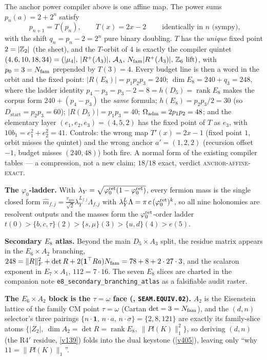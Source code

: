 \begin{keybox}
The anchor power compiler above is one affine map.  The power sums $p_n(a)=2+2^n$ satisfy
\[
  \boxed{\ p_{n+1}=T(p_n),\qquad T(x)=2x-2\ }\qquad\text{identically in $n$ (sympy),}
\]
with the shift $q_n=p_n-2=2^n$ pure binary doubling.  $T$ has the \emph{unique} fixed point
$2=|\mathbb{Z}_2|$ (the sheet), and the $T$-orbit of $4$ is exactly the compiler quintet
$(4,6,10,18,34)=(|\mu_4|,\,|R^+(A_3)|,\,\mathcal A_\Lambda,\,N_{\mathrm{fam}}|R^+(A_3)|,\,\text{$\mathbb{Z}_6$ lift})$, with
$p_0=3=N_{\mathrm{fam}}$ prepended by $T(3)=4$.  Every budget line is then a word in the orbit and the fixed
point: $|R(E_8)|=p_1p_2p_3=240$; $\dim E_8=240+q_3=248$, where the ladder identity
$p_4-p_3=p_3-2=8=h(D_5)=\operatorname{rank}E_8$ makes the corpus form $240+(p_4{-}p_3)$ the
\emph{same} formula; $h(E_8)=p_2p_3/2=30$ (so $D_{\mathrm{start}}=p_2p_3=60$); $|R(D_5)|=p_1p_3=40$;
$\Omega_{\mathrm{adm}}=2p_1p_2=48$; and the elementary layer $(e_1,e_2,e_3)=(4,5,2)$ has the fixed point of $T$ as
$e_3$, with $10b_1=e_1^2+e_2^2=41$.  Controls: the wrong map $T'(x)=2x-1$ (fixed point $1$, orbit
misses the quintet) and the wrong anchor $a'=(1,2,2)$ (recursion offset $-1$, budget misses
$(240,48)$) both fire.  A normal form of the existing compiler tables --- a compression, not a new
claim; $18/18$ exact, verdict \textsc{anchor-affine-exact}.
\end{keybox}

\noindent\textbf{The $\varphi_0$-ladder.} With $\lambda_Y=\sqrt{\varphi_0^{\mathrm{ret}}(1-\varphi_0^{\mathrm{ret}})}$, every fermion mass is the
single closed form $\hat m_{f,j}=\tfrac{v_{\mathrm{geo}}}{\sqrt2}\lambda_Y^{L_{f,j}}\Lambda_{f,j}$ with
$\lambda_Y^{L}\Lambda=\pi\,c\,(\varphi_0^{\mathrm{ret}})^{k}$, so all nine holonomies are resolvent outputs and the masses
form the $\varphi_0^{\mathrm{ret}}$-order ladder $t(0)>\{b,c,\tau\}(2)>\{s,\mu\}(3)>\{u,d\}(4)>e(5)$.

\noindent\textbf{Secondary $E_8$ atlas.} Beyond the main $D_5\times A_3$ split, the residue matrix appears
in the $E_6\times A_2$ branching, $248=\|R\|_F^2+\det R+2(\mathbf 1^\top Ra)N_{\mathrm{fam}}=78+8+2\cdot27\cdot3$, and
the scalaron exponent in $E_7\times A_1$, $112=7\cdot16$. The seven $E_8$ slices are charted in the
companion note \texttt{e8\_secondary\_branching\_atlas} as a falsifiable audit raster.
\par\smallskip\noindent\textbf{The $E_6{\times}A_2$ block is the $\tau{=}\omega$ face
(, \texttt{SEAM.EQUIV.02}).} $A_2$ is the Eisenstein lattice of the family
CM point $\tau{=}\omega$ (Cartan $\det=3=N_{\mathrm{fam}}$), and the $(d,n)$ selector's three pairings
$\{n{\cdot}\mathbf1,\,n{\cdot}a,\,n{\cdot}\sigma\}=\{2,8,121\}$ are exactly its family-slice atoms
$\{|Z_2|,\ \dim A_2{=}\det R{=}\operatorname{rank}E_8,\ \|Pl(K)\|_1^2\}$, so deriving $(d,n)$ (the R4$'$
residue, \vref{v139}) folds into the dual keystone (\vref{v405}), leaving only ``why $11{=}\|Pl(K)\|_1$''.

